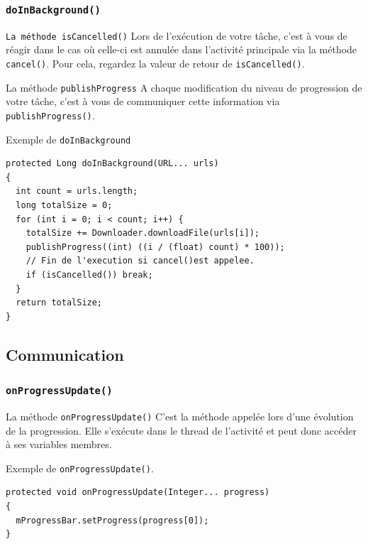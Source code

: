 \documentclass{beamer}
\begin{document}
\begin{frame}
\frametitle{\verb!doInBackground()!}
\begin{block}{\verb!La méthode isCancelled()!}
Lors de l'exécution de votre tâche, c'est à vous de réagir dans le cas où celle-ci est annulée dans l'activité principale via la méthode \verb!cancel()!. Pour cela, regardez la valeur de retour de \verb!isCancelled()!.
\end{block}
\pause
\begin{block}{La méthode \verb!publishProgress!}
A chaque modification du niveau de progression de votre tâche, c'est à vous de communiquer cette information via \verb!publishProgress()!.
\end{block}
\end{frame}

\begin{frame}[fragile]
\begin{exampleblock}{Exemple de \verb!doInBackground!}
\begin{lstlisting}
protected Long doInBackground(URL... urls)
{
  int count = urls.length;
  long totalSize = 0;
  for (int i = 0; i < count; i++) {
    totalSize += Downloader.downloadFile(urls[i]);
    publishProgress((int) ((i / (float) count) * 100));
    // Fin de l'execution si cancel()est appelee.
    if (isCancelled()) break;
  }
  return totalSize;
}
\end{lstlisting}
\end{exampleblock}
\end{frame}

\subsection{Communication}
\begin{frame}[fragile]
\frametitle{\verb!onProgressUpdate()!}
\begin{block}{La méthode \verb!onProgressUpdate()!}
C'est la méthode appelée lors d'une évolution de la progression. Elle s'exécute dans le thread de l'activité et peut donc accéder à ses variables membres.
\end{block}
\begin{exampleblock}{Exemple de \verb!onProgressUpdate()!.}
\begin{lstlisting}
protected void onProgressUpdate(Integer... progress)
{
  mProgressBar.setProgress(progress[0]);
}
\end{lstlisting}
\end{exampleblock}
\end{frame}
\end{document}
